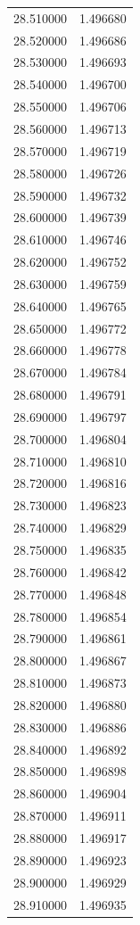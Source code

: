 \begin{tabular}{rr}
28.510000 & 1.496680 \\
28.520000 & 1.496686 \\
28.530000 & 1.496693 \\
28.540000 & 1.496700 \\
28.550000 & 1.496706 \\
28.560000 & 1.496713 \\
28.570000 & 1.496719 \\
28.580000 & 1.496726 \\
28.590000 & 1.496732 \\
28.600000 & 1.496739 \\
28.610000 & 1.496746 \\
28.620000 & 1.496752 \\
28.630000 & 1.496759 \\
28.640000 & 1.496765 \\
28.650000 & 1.496772 \\
28.660000 & 1.496778 \\
28.670000 & 1.496784 \\
28.680000 & 1.496791 \\
28.690000 & 1.496797 \\
28.700000 & 1.496804 \\
28.710000 & 1.496810 \\
28.720000 & 1.496816 \\
28.730000 & 1.496823 \\
28.740000 & 1.496829 \\
28.750000 & 1.496835 \\
28.760000 & 1.496842 \\
28.770000 & 1.496848 \\
28.780000 & 1.496854 \\
28.790000 & 1.496861 \\
28.800000 & 1.496867 \\
28.810000 & 1.496873 \\
28.820000 & 1.496880 \\
28.830000 & 1.496886 \\
28.840000 & 1.496892 \\
28.850000 & 1.496898 \\
28.860000 & 1.496904 \\
28.870000 & 1.496911 \\
28.880000 & 1.496917 \\
28.890000 & 1.496923 \\
28.900000 & 1.496929 \\
28.910000 & 1.496935 \\

\end{tabular}
